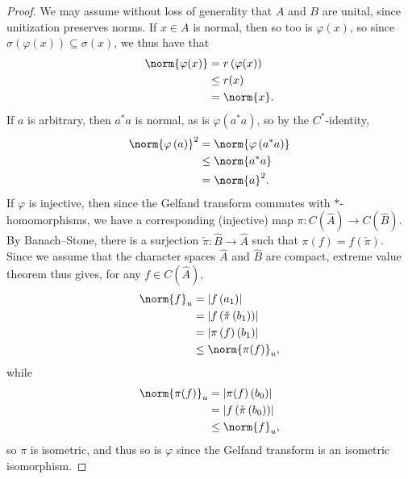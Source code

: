 \documentclass[10pt]{mypackage}
\begin{document}
\begin{proof}
  We may assume without loss of generality that $A$ and $B$ are unital, since unitization preserves norms. If $x\in A$ is normal, then so too is $\varphi(x)$, so since $\sigma\left( \varphi(x) \right)\subseteq \sigma(x)$, we thus have that
  \begin{align*}
    \norm{\varphi(x)} &= r\left( \varphi(x) \right)\\
                      &\leq r(x)\\
                      &= \norm{x}.
  \end{align*}
  If $a$ is arbitrary, then $a^{\ast}a$ is normal, as is $\varphi\left( a^{\ast}a \right)$, so by the $C^{\ast}$-identity,
  \begin{align*}
    \norm{\varphi\left( a \right)}^2 &= \norm{\varphi\left( a^{\ast}a \right)}\\
                                     &\leq \norm{a^{\ast}a}\\
                                     &= \norm{a}^2.
  \end{align*}
  If $\varphi$ is injective, then since the Gelfand transform commutes with $\ast$-homomorphisms, we have a corresponding (injective) map $\pi\colon C(\hat{A})\rightarrow C(\hat{B})$. By Banach--Stone, there is a surjection $\check{\pi}\colon \hat{B}\rightarrow \hat{A}$ such that $\pi(f) = f(\check{\pi})$. Since we assume that the character spaces $\hat{A}$ and $\hat{B}$ are compact, extreme value theorem thus gives, for any $f\in C(\hat{A})$,
  \begin{align*}
    \norm{f}_{u} &= \left\vert f\left( a_1 \right) \right\vert\\
                 &= \left\vert f\left( \check{\pi}\left(b_1\right) \right) \right\vert\\
                 &= \left\vert \pi\left(f\right)\left( b_1 \right) \right\vert\\
                 &\leq \norm{\pi(f)}_{u},
  \end{align*}
  while
  \begin{align*}
    \norm{\pi(f)}_{u} &= \left\vert \pi(f)\left( b_0 \right) \right\vert\\
                      &= \left\vert f\left( \check{\pi}\left(b_0\right) \right) \right\vert\\
                      &\leq \norm{f}_{u},
  \end{align*}
  so $\pi$ is isometric, and thus so is $\varphi$ since the Gelfand transform is an isometric isomorphism.
\end{proof}
\nocite{davidson_functional_analysis,blackadar_operator_algebras}
\printbibliography 
\end{document}
